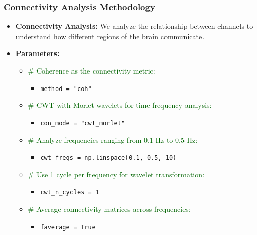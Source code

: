 \documentclass{beamer}
\begin{document}
\begin{frame}
    \frametitle{Connectivity Analysis Methodology}
    \begin{itemize}
        \item \textbf{Connectivity Analysis:} We analyze the relationship between channels to understand how different regions of the brain communicate.
        \item \textbf{Parameters:}
            \begin{itemize}
                \item \textcolor{darkgreen}{\# Coherence as the connectivity metric:}
                \begin{itemize}
                    \item \texttt{method = "coh"}
                \end{itemize}
                \item \textcolor{darkgreen}{\# CWT with Morlet wavelets for time-frequency analysis:}
                \begin{itemize}
                    \item \texttt{con\_mode = "cwt\_morlet"}
                \end{itemize}
                \item \textcolor{darkgreen}{\# Analyze frequencies ranging from 0.1 Hz to 0.5 Hz:}
                \begin{itemize}
                    \item \texttt{cwt\_freqs = np.linspace(0.1, 0.5, 10)}
                \end{itemize}
                \item \textcolor{darkgreen}{\# Use 1 cycle per frequency for wavelet transformation:}
                \begin{itemize}
                    \item \texttt{cwt\_n\_cycles = 1}
                \end{itemize}
                \item \textcolor{darkgreen}{\# Average connectivity matrices across frequencies:}
                \begin{itemize}
                    \item \texttt{faverage = True}
                \end{itemize}
            \end{itemize}
    \end{itemize}
\end{frame}
\end{document}
